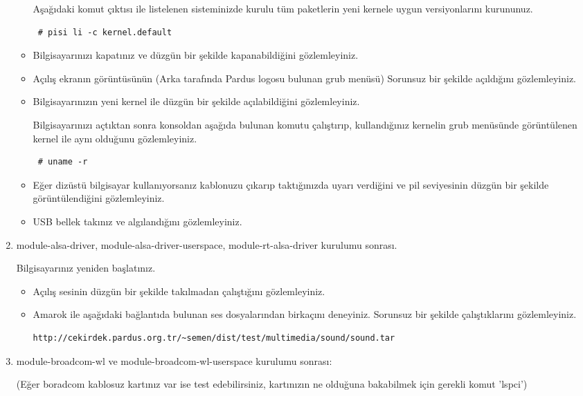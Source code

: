 \documentclass[a4paper,10pt]{article}
\begin{document}
\begin{enumerate}
\begin{itemize}
Aşağıdaki komut çıktısı ile listelenen sisteminizde kurulu tüm paketlerin yeni kernele uygun versiyonlarını kurununuz.
\begin{verbatim}
 # pisi li -c kernel.default
\end{verbatim}

\item Bilgisayarınızı kapatınız ve düzgün bir şekilde kapanabildiğini gözlemleyiniz.
\item Açılış ekranın görüntüsünün (Arka tarafında Pardus logosu bulunan grub menüsü) Sorunsuz bir şekilde açıldığını gözlemleyiniz.
\item Bilgisayarınızın yeni kernel ile düzgün bir şekilde açılabildiğini gözlemleyiniz.

Bilgisayarınızı açtıktan sonra konsoldan aşağıda bulunan komutu çalıştırıp, kullandığınız kernelin grub menüsünde görüntülenen kernel ile aynı olduğunu gözlemleyiniz.
\begin{verbatim}
 # uname -r 
\end{verbatim}

\item Eğer dizüstü bilgisayar kullanıyorsanız kablonuzu çıkarıp taktığınızda uyarı verdiğini ve pil seviyesinin düzgün bir şekilde görüntülendiğini gözlemleyiniz.
\item USB bellek takınız ve algılandığını gözlemleyiniz.
\end{itemize}

\item module-alsa-driver, module-alsa-driver-userspace, module-rt-alsa-driver kurulumu sonrası.

Bilgisayarınız yeniden başlatınız.
\begin{itemize}
\item Açılış sesinin düzgün bir şekilde takılmadan çalıştığını gözlemleyiniz.

\item Amarok ile aşağıdaki bağlantıda bulunan ses dosyalarından birkaçını deneyiniz. Sorunsuz bir şekilde çalıştıklarını gözlemleyiniz.
\begin{verbatim}
http://cekirdek.pardus.org.tr/~semen/dist/test/multimedia/sound/sound.tar 
\end{verbatim}

\end{itemize}

\item module-broadcom-wl ve module-broadcom-wl-userspace kurulumu sonrası: 

(Eğer boradcom kablosuz kartınız var ise test edebilirsiniz, kartınızın ne olduğuna bakabilmek için gerekli komut 'lspci')


\end{enumerate}
\end{document}

